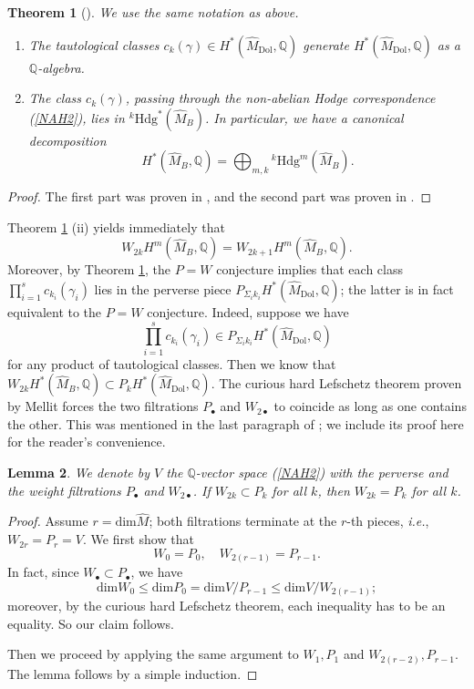 \documentclass[11pt]{amsart}
\theoremstyle{plain}
\newtheorem{thm}{Theorem}[section]
\newtheorem{lem}[thm]{Lemma}
\theoremstyle{definition}
\theoremstyle{remark}
\newcommand{\BQ}{{\mathbb{Q}}}
\begin{document}
\begin{thm}[\cite{Markman, Shende}]\label{thm2.1}
We use the same notation as above.
\begin{enumerate}
    \item[(i)] The tautological classes $c_k(\gamma)\in H^*(\widehat{M}_{\mathrm{Dol}}, \BQ)$ generate $H^*(\widehat{M}_\mathrm{Dol}, \BQ)$ as a $\BQ$-algebra.
    \item[(ii)] The class $c_k(\gamma)$, passing through the non-abelian Hodge correspondence (\ref{NAH2}), lies in $^k\mathrm{Hdg}^*(\widehat{M}_B)$. In particular, we have a canonical decomposition
    \[
H^*(\widehat{M}_B, \BQ) = \bigoplus_{m,k} {^k\mathrm{Hdg}^m(\widehat{M}_B)}.    \]
\end{enumerate}
\end{thm}

\begin{proof}
The first part was proven in \cite{Markman}, and the second part was proven in \cite{Shende}.
\end{proof}


Theorem \ref{thm2.1} (ii) yields immediately that 
\[
W_{2k}H^m(\widehat{M}_B, \BQ) = W_{2k+1}H^m(\widehat{M}_B, \BQ).
\]
Moreover, by Theorem \ref{thm2.1}, the $P=W$ conjecture implies that each class $\prod_{i=1}^s c_{k_i}(\gamma_i)$ lies in the perverse piece $P_{\Sigma_i{k_i}}H^*(\widehat{M}_{\mathrm{Dol}}, \BQ)$; the latter is in fact equivalent to the $P=W$ conjecture. Indeed, suppose we have 
\begin{equation}\label{taut}
\prod_{i=1}^s c_{k_i}(\gamma_i) \in P_{\Sigma_i{k_i}}H^*(\widehat{M}_{\mathrm{Dol}}, \BQ)
\end{equation}
for any product of tautological classes.
Then we know that $W_{2k}H^*(\widehat{M}_B, \BQ) \subset P_kH^*(\widehat{M}_{\mathrm{Dol}}, \BQ)$. The curious hard Lefschetz theorem proven by Mellit \cite{Mellit} forces the two filtrations $P_\bullet$ and $W_{2\bullet}$ to coincide as long as one contains the other. This was mentioned in the last paragraph of \cite[Section 1]{Mellit}; we include its proof here for the reader's convenience.

\begin{lem}
We denote by $V$ the $\BQ$-vector space (\ref{NAH2}) with the perverse and the weight filtrations $P_\bullet$ and $W_{2\bullet}$. If $W_{2k} \subset P_k$ for all $k$, then $W_{2k} = P_k$ for all $k$.
\end{lem}

\begin{proof}
Assume $r = \mathrm{dim}\widehat{M}$; both filtrations terminate at the $r$-th pieces, \emph{i.e.}, $W_{2r} = P_{r} = V$. We first show that 
\[
W_0 = P_0, \quad W_{2(r-1)} = P_{r-1}. 
\]
In fact, since $W_\bullet  \subset P_\bullet$, we have
\[
\mathrm{dim} W_0 \leq \mathrm{dim} P_0 = \mathrm{dim}V/P_{r-1} \leq \mathrm{dim} V/W_{2(r-1)};
\]
moreover, by the curious hard Lefschetz theorem, each inequality has to be an equality. So our claim follows. 

Then we proceed by applying the same argument to $W_1, P_1$ and $W_{2(r-2)}, P_{r-1}$. The lemma follows by a simple induction.
\end{proof}
\end{document}
